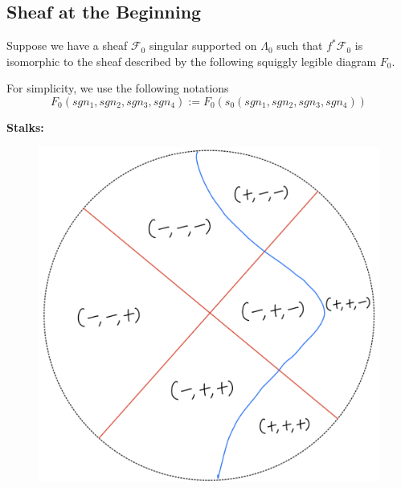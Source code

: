 \subsection*{Sheaf at the Beginning}
Suppose we have a sheaf $\mathscr{F}_0$ singular supported on $\Lambda_0$ such that $f^*\mathscr{F}_0$ is isomorphic to the sheaf described by the following squiggly legible diagram $F_0$.

For simplicity, we use the following notations
\[
F_0(sgn_1,sgn_2,sgn_3,sgn_4):= F_0(s_0(sgn_1,sgn_2,sgn_3,sgn_4))
\]

\textbf{Stalks:}
\begin{figure}[H]
    \centering
    \includegraphics[scale = 0.45]{diagrams/lemma4/19.png}
    \caption{}
    \label{fig:your-label}
\end{figure}
